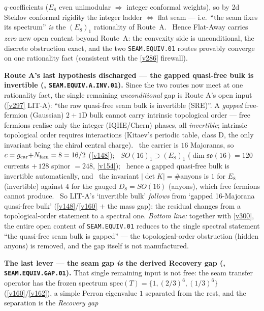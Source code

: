 $q$-coefficients ($E_8$ even unimodular $\Rightarrow$ integer conformal weights), so by 2d Steklov conformal
rigidity the integer ladder $\Leftrightarrow$ flat seam --- i.e.\ ``the seam fixes its spectrum'' \emph{is} the
$(E_8)_1$ rationality of Route~A. \mO\ Hence Flat-Away carries \emph{zero} new open content beyond Route~A: the
convexity side is unconditional, the discrete obstruction exact, and the two \texttt{SEAM.EQUIV.01} routes
provably converge on one rationality fact (consistent with the \vref{v286} firewall).
\par\smallskip\noindent\textbf{Route A's last hypothesis discharged --- the gapped quasi-free bulk is
invertible (, \texttt{SEAM.EQUIV.A.INV.01}).} Since the two routes now meet
at one rationality fact, the single remaining \emph{unconditional} gap is Route A's open input (\vref{v297}
LIT-A): ``the raw quasi-free seam bulk is invertible (SRE)''. A \emph{gapped} free-fermion (Gaussian) $2{+}1$D
bulk cannot carry intrinsic topological order --- free fermions realise only the integer (IQHE/Chern) phases,
all \emph{invertible}; intrinsic topological order requires interactions (Kitaev's periodic table, class D, the
only invariant being the chiral central charge). \mE\ the carrier is $16$ Majoranas, so
$c=g_{\mathrm{car}}{+}N_{\mathrm{fam}}=8=16/2$ (\vref{v148}); \mE\ $SO(16)_1\supset(E_8)_1$ ($\dim\mathfrak{so}(16)=120$
currents $+\,128$ spinor $=248$, \vref{v154}); \mC\ hence a gapped quasi-free bulk is invertible
automatically, and \mE\ the invariant $|\det K|=\#$anyons is $1$ for $E_8$ (invertible) against $4$ for the
gauged $D_8{=}SO(16)$ (anyons), which free fermions cannot produce. \mO\ So LIT-A's `invertible bulk'
\emph{follows} from `gapped 16-Majorana quasi-free bulk' (\vref{v148}/\vref{v160} $+$ the mass gap): the
residual changes from a topological-order statement to a spectral one. \emph{Bottom line:} together with
\vref{v300}, the entire open content of \texttt{SEAM.EQUIV.01} reduces to the single spectral statement ``the
quasi-free seam bulk is gapped'' --- the topological-order obstruction (hidden anyons) is removed, and the gap
itself is not manufactured.
\par\smallskip\noindent\textbf{The last lever --- the seam gap \emph{is} the derived Recovery gap
(, \texttt{SEAM.EQUIV.GAP.01}).} That single remaining input is not free: the seam
transfer operator has the frozen spectrum $\mathrm{spec}(T)=\{1,(2/3)^6,(1/3)^6\}$ (\vref{v160}/\vref{v162}),
a simple Perron eigenvalue $1$ separated from the rest, and the separation is the \emph{Recovery gap}
